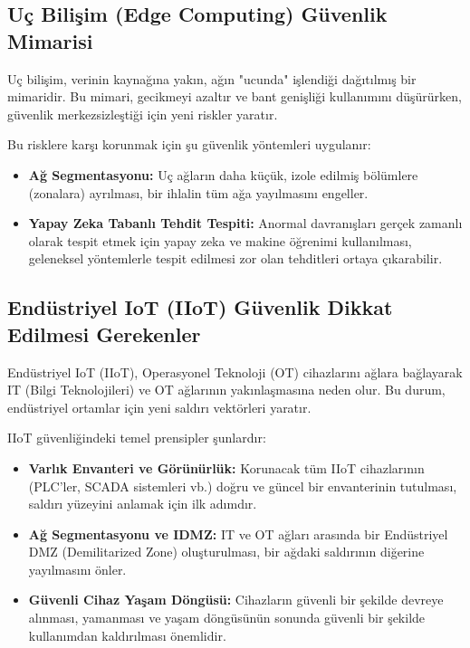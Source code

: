 \subsection{Uç Bilişim (Edge Computing) Güvenlik Mimarisi}

Uç bilişim, verinin kaynağına yakın, ağın "ucunda" işlendiği dağıtılmış bir mimaridir. Bu mimari, gecikmeyi azaltır ve bant genişliği kullanımını düşürürken, güvenlik merkezsizleştiği için yeni riskler yaratır.

Bu risklere karşı korunmak için şu güvenlik yöntemleri uygulanır:
\begin{itemize}
    \item \textbf{Ağ Segmentasyonu:} Uç ağların daha küçük, izole edilmiş bölümlere (zonalara) ayrılması, bir ihlalin tüm ağa yayılmasını engeller.
    \item \textbf{Yapay Zeka Tabanlı Tehdit Tespiti:} Anormal davranışları gerçek zamanlı olarak tespit etmek için yapay zeka ve makine öğrenimi kullanılması, geleneksel yöntemlerle tespit edilmesi zor olan tehditleri ortaya çıkarabilir.
\end{itemize}

\subsection{Endüstriyel IoT (IIoT) Güvenlik Dikkat Edilmesi Gerekenler}

Endüstriyel IoT (IIoT), Operasyonel Teknoloji (OT) cihazlarını ağlara bağlayarak IT (Bilgi Teknolojileri) ve OT ağlarının yakınlaşmasına neden olur. Bu durum, endüstriyel ortamlar için yeni saldırı vektörleri yaratır.

IIoT güvenliğindeki temel prensipler şunlardır:
\begin{itemize}
    \item \textbf{Varlık Envanteri ve Görünürlük:} Korunacak tüm IIoT cihazlarının (PLC'ler, SCADA sistemleri vb.) doğru ve güncel bir envanterinin tutulması, saldırı yüzeyini anlamak için ilk adımdır.
    \item \textbf{Ağ Segmentasyonu ve IDMZ:} IT ve OT ağları arasında bir Endüstriyel DMZ (Demilitarized Zone) oluşturulması, bir ağdaki saldırının diğerine yayılmasını önler.
    \item \textbf{Güvenli Cihaz Yaşam Döngüsü:} Cihazların güvenli bir şekilde devreye alınması, yamanması ve yaşam döngüsünün sonunda güvenli bir şekilde kullanımdan kaldırılması önemlidir.
\end{itemize}

